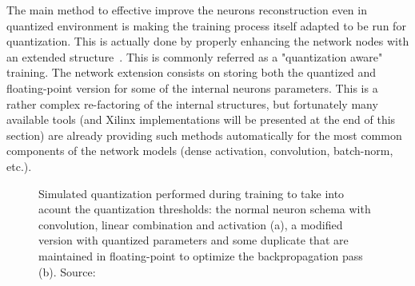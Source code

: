 The main method to effective improve the neurons reconstruction even in quantized environment is making the training process itself adapted to be run for quantization. This is actually done by properly enhancing the network nodes with an extended structure~\cite{Jacob_2018}. 
This is commonly referred as a "quantization aware" training. The network extension consists on storing both the quantized and floating-point version for some of the internal neurons parameters.
This is a rather complex re-factoring of the internal structures, but fortunately many available tools (\Tensorflow and Xilinx implementations will be presented at the end of this section) are already providing such methods automatically for the most common components of the network models (dense activation, convolution, batch-norm, etc.). 
%
\begin{figure}
    \centering
    \caption{Simulated quantization performed during training to take into acount the quantization thresholds: the normal neuron schema with convolution, linear combination and activation (a), a modified version with quantized parameters and some duplicate that are maintained in floating-point to optimize the backpropagation pass (b). Source:~\cite{Jacob_2018} }
    \label{fig:qnn_neuron}
\end{figure}

